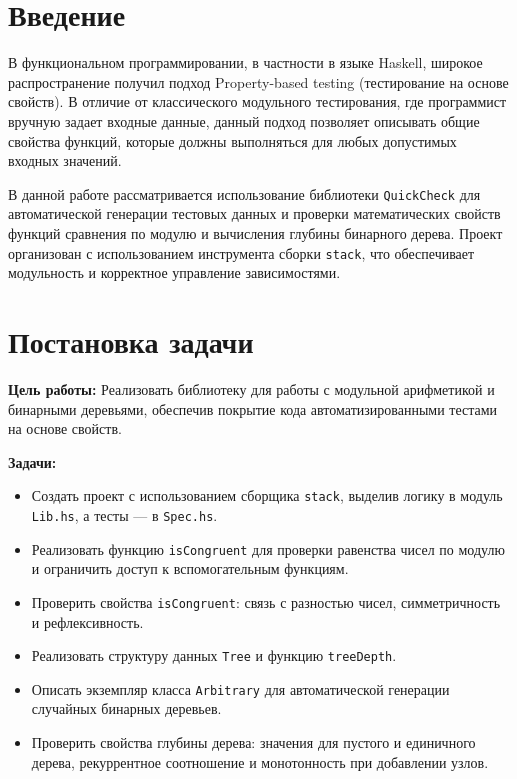 \documentclass[a4paper, final]{article}
\begin{document}
	\newpage
	
	\tableofcontents
	
	\newpage
	\section*{Введение}
	
	В функциональном программировании, в частности в языке Haskell, широкое распространение получил подход Property-based testing (тестирование на основе свойств). В отличие от классического модульного тестирования, где программист вручную задает входные данные, данный подход позволяет описывать общие свойства функций, которые должны выполняться для любых допустимых входных значений.
	
	В данной работе рассматривается использование библиотеки \texttt{QuickCheck} для автоматической генерации тестовых данных и проверки математических свойств функций сравнения по модулю и вычисления глубины бинарного дерева. Проект организован с использованием инструмента сборки \texttt{stack}, что обеспечивает модульность и корректное управление зависимостями.
	
	\newpage
	\section*{Постановка задачи}
	\par \textbf{Цель работы:} Реализовать библиотеку для работы с модульной арифметикой и бинарными деревьями, обеспечив покрытие кода автоматизированными тестами на основе свойств.
	\par \textbf{Задачи:}
	\begin{itemize}
		\item Создать проект с использованием сборщика \texttt{stack}, выделив логику в модуль \texttt{Lib.hs}, а тесты — в \texttt{Spec.hs}.
		\item Реализовать функцию \texttt{isCongruent} для проверки равенства чисел по модулю и ограничить доступ к вспомогательным функциям.
		\item Проверить свойства \texttt{isCongruent}: связь с разностью чисел, симметричность и рефлексивность.
		\item Реализовать структуру данных \texttt{Tree} и функцию \texttt{treeDepth}.
		\item Описать экземпляр класса \texttt{Arbitrary} для автоматической генерации случайных бинарных деревьев.
		\item Проверить свойства глубины дерева: значения для пустого и единичного дерева, рекуррентное соотношение и монотонность при добавлении узлов.
	\end{itemize}
	
\end{document}

